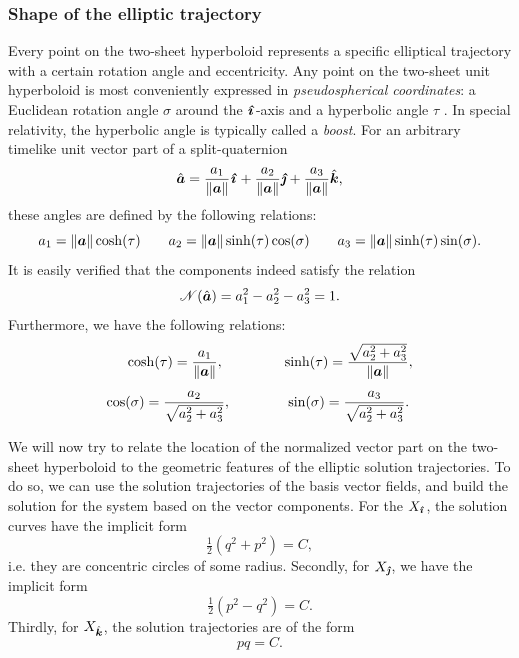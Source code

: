 \subsubsection{Shape of the elliptic trajectory}
Every point on the two-sheet hyperboloid represents a specific elliptical trajectory with a certain rotation angle and eccentricity. Any point on the two-sheet unit hyperboloid is most conveniently expressed in \emph{pseudospherical coordinates}: a Euclidean rotation angle $\sigma$ around the $\quati$-axis and a hyperbolic angle $\tau$ \cite{Balazs1986}. In special relativity, the hyperbolic angle is typically called a \emph{boost}. For an arbitrary timelike unit vector part of a split-quaternion 
$$ \uvec{a} = \frac{a_1}{\norm{\vec{a}}}\quati + \frac{a_2}{\norm{\vec{a}}}\quatj + \frac{a_3}{\norm{\vec{a}}}\quatk, $$
these angles are defined by the following relations:
$$ a_1 = \norm{\vec{a}}\cosh(\tau) \qquad a_2 = \norm{\vec{a}}\sinh(\tau) \cos(\sigma) \qquad a_3 = \norm{\vec{a}}\sinh(\tau) \sin(\sigma). $$
It is easily verified that the components indeed satisfy the relation
$$ \mathscr{N}(\uvec{a}) = a_1^2 - a_2^2 - a_3^2 = 1. $$
Furthermore, we have the following relations:
\begin{equation} 
    \begin{array}{cc}
        \displaystyle \cosh(\tau) = \frac{a_1}{\norm{\vec{a}}}, \quad & \quad 
        \displaystyle \sinh(\tau) = \frac{\sqrt{a_2^2 + a_3^2}}{\norm{\vec{a}}}, \\[0.5cm]
        \displaystyle \cos(\sigma) = \frac{a_2}{\sqrt{a_2^2 + a_3^2}}, \qquad & \quad
        \displaystyle \sin(\sigma) = \frac{a_3}{\sqrt{a_2^2 + a_3^2}}. 
    \end{array}
    \label{eq:hyperb_coordinate_relations}
\end{equation}

We will now try to relate the location of the normalized vector part on the two-sheet hyperboloid to the geometric features of the elliptic solution trajectories. To do so, we can use the solution trajectories of the basis vector fields, and build the solution for the system based on the vector components. For the $X_\quati$, the solution curves have the implicit form 
$$ \tfrac{1}{2}(q^2 + p^2) = C, $$
i.e. they are concentric circles of some radius. Secondly, for $X_\quatj$, we have the implicit form
$$ \tfrac{1}{2}(p^2 - q^2) = C.  $$
Thirdly, for $X_\quatk$, the solution trajectories are of the form
$$ pq = C. $$

